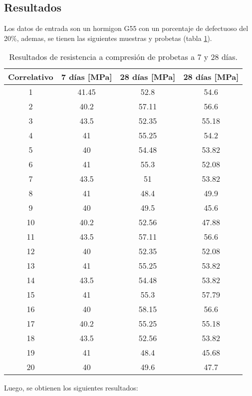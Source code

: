 \subsection{Resultados}

Los datos de entrada son un hormigon G55 con un porcentaje de defectuoso del 20\%, ademas, se tienen las siguientes muestras y probetas (tabla \ref{tab:datosentrada}).

\begin{table}[H]
\centering
\begin{tabular}{|c|c|c|c|}
\hline
\textbf{Correlativo} & \textbf{7 días [MPa]} & \textbf{28 días [MPa]} & \textbf{28 días [MPa]} \\ \hline
1  & 41.45 & 52.8  & 54.6  \\ \hline
2  & 40.2  & 57.11 & 56.6  \\ \hline
3  & 43.5  & 52.35 & 55.18 \\ \hline
4  & 41    & 55.25 & 54.2  \\ \hline
5  & 40    & 54.48 & 53.82 \\ \hline
6  & 41    & 55.3  & 52.08 \\ \hline
7  & 43.5  & 51    & 53.82 \\ \hline
8  & 41    & 48.4  & 49.9  \\ \hline
9  & 40    & 49.5  & 45.6  \\ \hline
10 & 40.2  & 52.56 & 47.88 \\ \hline
11 & 43.5  & 57.11 & 56.6  \\ \hline
12 & 40    & 52.35 & 52.08 \\ \hline
13 & 41    & 55.25 & 53.82 \\ \hline
14 & 43.5  & 54.48 & 53.82 \\ \hline
15 & 41    & 55.3  & 57.79 \\ \hline
16 & 40    & 58.15 & 56.6  \\ \hline
17 & 40.2  & 55.25 & 55.18 \\ \hline
18 & 43.5  & 52.56 & 53.82 \\ \hline
19 & 41    & 48.4  & 45.68 \\ \hline
20 & 40    & 49.6  & 47.7  \\ \hline
\end{tabular}
\caption{Resultados de resistencia a compresión de probetas a 7 y 28 días.}
\label{tab:datosentrada}
\end{table}

Luego, se obtienen los siguientes resultados: 

